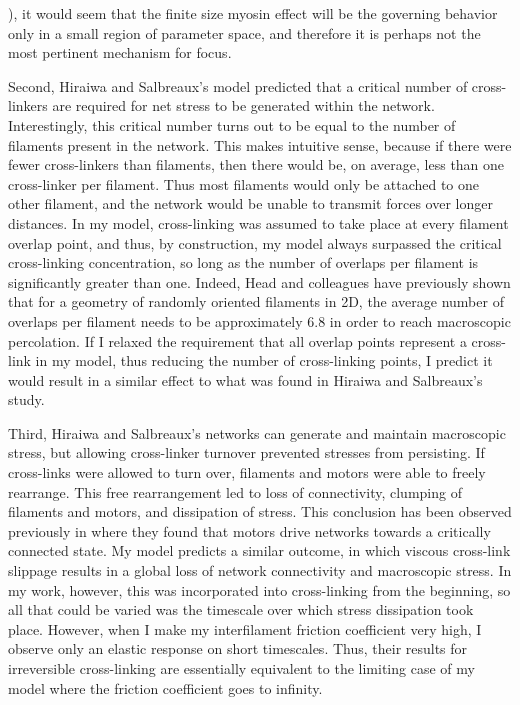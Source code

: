 \cite{PhysRevX.4.041002}), it would seem that the finite size myosin effect will be the governing behavior only in a small region of parameter space, and therefore it is perhaps not the most pertinent mechanism for focus.

Second, Hiraiwa and Salbreaux's model predicted that a critical number of cross-linkers are required for net stress to be generated within the network.  Interestingly, this critical number turns out to be equal to the number of filaments present in the network.  This makes intuitive sense, because if there were fewer cross-linkers than filaments, then there would be, on average, less than one cross-linker per filament. Thus most filaments would only be attached to one other filament, and the network would be unable to transmit forces over longer distances.  In my model, cross-linking was assumed to take place at every filament overlap point, and thus, by construction, my model always surpassed the critical cross-linking concentration, so long as the number of overlaps per filament is significantly greater than one. Indeed, Head and colleagues \cite{theo_hlm} have previously shown that for a geometry of randomly oriented filaments in 2D, the average number of overlaps per filament needs to be approximately 6.8 in order to reach macroscopic percolation.  If I relaxed the requirement that all overlap points represent a cross-link in my model, thus reducing the number of cross-linking points, I predict it would result in a similar effect to what was found in Hiraiwa and Salbreaux's study.  

Third, Hiraiwa and Salbreaux's networks can generate and maintain macroscopic stress, but allowing  cross-linker turnover prevented stresses from persisting.  If cross-links were allowed to turn over, filaments and motors were able to freely rearrange.  This free rearrangement led to loss of connectivity, clumping of filaments and motors, and dissipation of stress. This conclusion has been observed previously in \cite{Alvarado:2013aa} where they found that motors drive networks towards a critically connected state.  My model predicts a similar outcome, in which viscous cross-link slippage results in a global loss of network connectivity and macroscopic stress.  In my work, however, this was incorporated into cross-linking from the beginning, so all that could be varied was the timescale over which stress dissipation took place.  However, when I make my interfilament friction coefficient very high, I observe only an elastic response on short timescales.  Thus, their results for irreversible cross-linking are essentially equivalent to the limiting case of my model where the friction coefficient goes to infinity.


